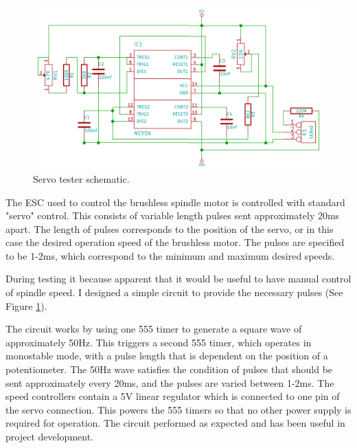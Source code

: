 \documentclass[a4paper,11pt]{article}  %
\begin{document}
\begin{figure}[ht!]
\centering
\includegraphics[width=160mm]{resources/servoexerciser.png}
\caption{Servo tester schematic.}
\label{fig:servotesterschem}
\end{figure}

The ESC used to control the brushless spindle motor is controlled with standard "servo" control. This consists of variable length pulses sent approximately 20ms apart.
The length of pulses corresponds to the position of the servo, or in this case the desired operation speed of the brushless motor. The pulses are specified to be 1-2ms,
which correspond to the minimum and maximum desired speeds.

During testing it because apparent that it would be useful to have manual control of spindle speed. I designed a simple circuit to provide the necessary pulses (See Figure \ref{fig:servotesterschem}).

The circuit works by using one 555 timer to generate a square wave of approximately 50Hz. This triggers a second 555 timer, which operates in monostable mode, with a pulse length
that is dependent on the position of a potentiometer. The 50Hz wave satisfies the condition of pulses that should be sent approximately every 20ms, and the pulses are varied between 1-2ms. The speed controllers
contain a 5V linear regulator which is connected to one pin of the servo connection. This powers the 555 timers so that no other power supply is required for operation. The circuit performed as expected and 
has been useful in project development.
\end{document}
